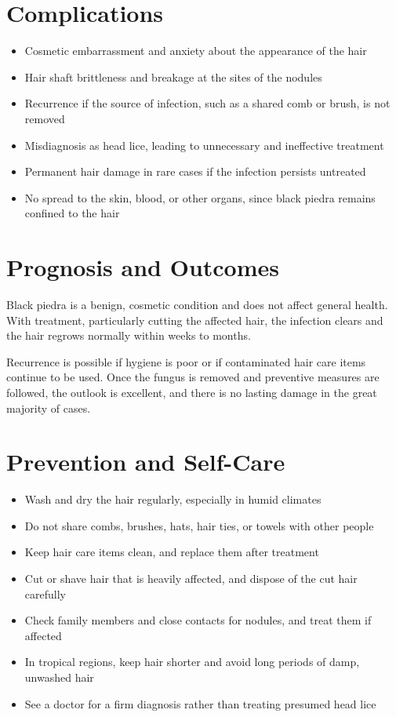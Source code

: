 \section*{Complications}
\begin{itemize}
    \item Cosmetic embarrassment and anxiety about the appearance of the hair
    \item Hair shaft brittleness and breakage at the sites of the nodules
    \item Recurrence if the source of infection, such as a shared comb or brush, is not removed
    \item Misdiagnosis as head lice, leading to unnecessary and ineffective treatment
    \item Permanent hair damage in rare cases if the infection persists untreated
    \item No spread to the skin, blood, or other organs, since black piedra remains confined to the hair
\end{itemize}

\section*{Prognosis and Outcomes}
Black piedra is a benign, cosmetic condition and does not affect general health. With treatment, particularly cutting the affected hair, the infection clears and the hair regrows normally within weeks to months.

Recurrence is possible if hygiene is poor or if contaminated hair care items continue to be used. Once the fungus is removed and preventive measures are followed, the outlook is excellent, and there is no lasting damage in the great majority of cases.

\section*{Prevention and Self-Care}
\begin{itemize}
    \item Wash and dry the hair regularly, especially in humid climates
    \item Do not share combs, brushes, hats, hair ties, or towels with other people
    \item Keep hair care items clean, and replace them after treatment
    \item Cut or shave hair that is heavily affected, and dispose of the cut hair carefully
    \item Check family members and close contacts for nodules, and treat them if affected
    \item In tropical regions, keep hair shorter and avoid long periods of damp, unwashed hair
    \item See a doctor for a firm diagnosis rather than treating presumed head lice
\end{itemize}

